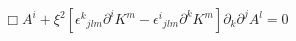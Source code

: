 \begin{equation}
{\Box}A^{i}+{\xi}^{2}[{{\epsilon}^{k}}_{jlm}{\partial}^{i}K^{m}-{{\epsilon}^{i}}_{jlm}{\partial}^{k}K^{m}]{\partial}_{k}{\partial}^{j}A^{l}=0
\label{17}
\end{equation}

